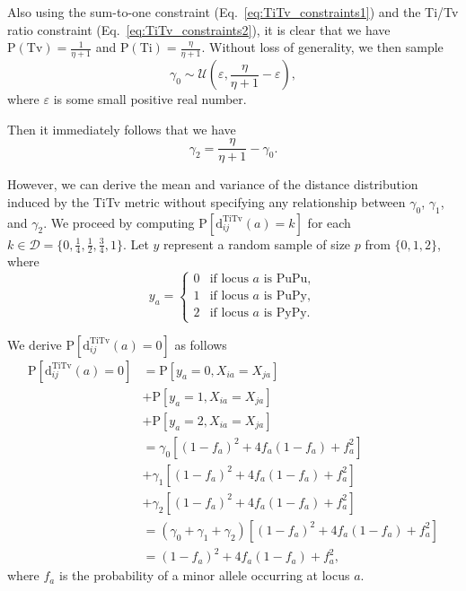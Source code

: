 \documentclass[10pt,letterpaper]{article}
\begin{document}
Also using the sum-to-one constraint (Eq.~\ref{eq:TiTv_constraints1}) and the Ti/Tv ratio constraint (Eq.~\ref{eq:TiTv_constraints2}), it is clear that we have $\text{P}(\text{Tv}) = \frac{1}{\eta + 1}$ and $\text{P}(\text{Ti}) = \frac{\eta}{\eta + 1}$. Without loss of generality, we then sample 
%
\begin{equation}\label{eq:gamma0}
\gamma_0 \sim \mathcal{U}\left(\varepsilon,\frac{\eta}{\eta + 1} - \varepsilon\right),
\end{equation}
%
where $\varepsilon$ is some small positive real number.

Then it immediately follows that we have 
%
\begin{equation}\label{eq:gamma2}
\gamma_2 = \frac{\eta}{\eta + 1} - \gamma_0.
\end{equation}

However, we can derive the mean and variance of the distance distribution induced by the TiTv metric without specifying any relationship between $\gamma_0$, $\gamma_1$, and $\gamma_2$. We proceed by computing $\text{P}\left[\text{d}^\text{TiTv}_{ij}(a) = k\right]$ for each $k \in \mathcal{D} = \bigl\{0,\frac{1}{4},\frac{1}{2},\frac{3}{4},1\bigr\}$. Let $y$ represent a random sample of size $p$ from $\{0,1,2\}$, where 
%
\begin{equation}\label{eq:yvec}
y_a = \begin{cases}
0 & \text{if locus } a \text{ is PuPu}, \\
1 & \text{if locus } a \text{ is PuPy}, \\
2 & \text{if locus } a \text{ is PyPy}.
\end{cases}
\end{equation}

We derive $\text{P}\left[\text{d}^\text{TiTv}_{ij}(a) = 0\right]$ as follows
%
\begin{equation}\label{eq:prob_TiTv_0}
\begin{aligned}
\text{P}\left[\text{d}^\text{TiTv}_{ij}(a) = 0\right] &= \text{P}\left[y_a = 0, X_{ia} = X_{ja}\right] \\
&+ \text{P}\left[y_a = 1, X_{ia} = X_{ja}\right] \\
&+ \text{P}\left[y_a = 2, X_{ia} = X_{ja}\right] \\
&= \gamma_0 \left[(1 - f_a)^2 + 4 f_a (1 - f_a) + f^2_a\right] \\
&+ \gamma_1 \left[(1 - f_a)^2 + 4 f_a (1 - f_a) + f^2_a\right] \\
&+ \gamma_2 \left[(1 - f_a)^2 + 4 f_a (1 - f_a) + f^2_a\right] \\
&= (\gamma_0 + \gamma_1 + \gamma_2)\left[(1 - f_a)^2 + 4 f_a (1 - f_a) + f^2_a\right] \\
&= (1 - f_a)^2 + 4 f_a (1 - f_a) + f^2_a,
\end{aligned}
\end{equation}
%
where $f_a$ is the probability of a minor allele occurring at locus $a$.
\end{document}
